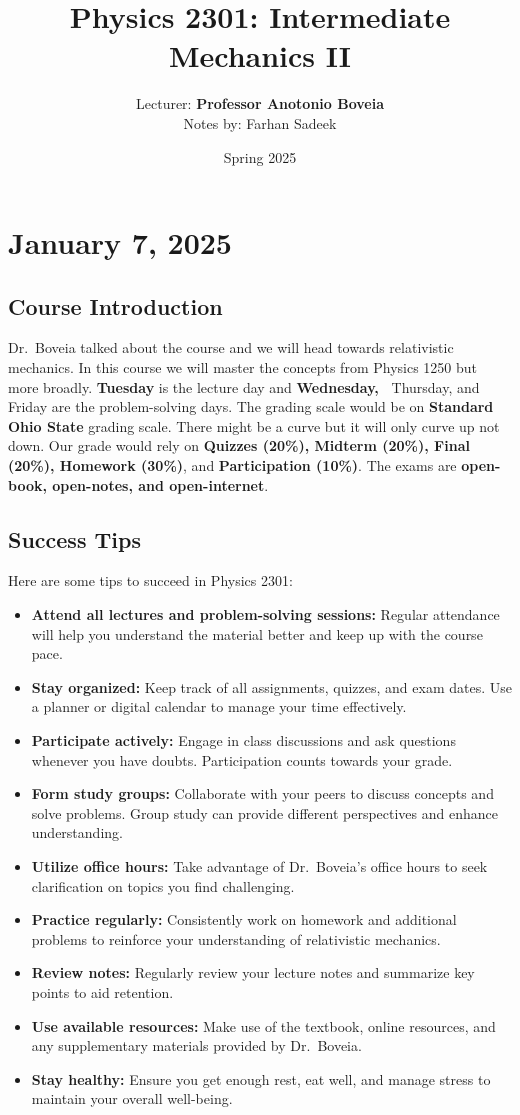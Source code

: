 \documentclass[11pt, draft]{article}
\title{Physics 2301: Intermediate Mechanics II} \author{Lecturer: \textbf{Professor Anotonio Boveia}\\Notes by: Farhan Sadeek} \date{Spring 2025}
\begin{document}
\maketitle
\section{January 7, 2025}
\subsection{Course Introduction}

Dr.\ Boveia talked about the course and we will head towards relativistic
mechanics. In this course we will master the concepts from Physics 1250 but
more broadly. \textbf{Tuesday} is the lecture day and \textbf{Wednesday,\ }
Thursday, and Friday are the problem-solving days. The grading scale would be
on \textbf{Standard Ohio State} grading scale. There might be a curve but it
will only curve up not down. Our grade would rely on \textbf{Quizzes (20\%),
    Midterm (20\%), Final (20\%), Homework (30\%)}, and \textbf{Participation
    (10\%)}. The exams are \textbf{open-book, open-notes, and open-internet}.

\subsection{Success Tips}
Here are some tips to succeed in Physics 2301:
\begin{itemize}
    \item \textbf{Attend all lectures and problem-solving sessions:} Regular attendance will help you understand the material better and keep up with the course pace.
    \item \textbf{Stay organized:} Keep track of all assignments, quizzes, and exam dates. Use a planner or digital calendar to manage your time effectively.
    \item \textbf{Participate actively:} Engage in class discussions and ask questions whenever you have doubts. Participation counts towards your grade.
    \item \textbf{Form study groups:} Collaborate with your peers to discuss concepts and solve problems. Group study can provide different perspectives and enhance understanding.
    \item \textbf{Utilize office hours:} Take advantage of Dr.\ Boveia's office hours to seek clarification on topics you find challenging.
    \item \textbf{Practice regularly:} Consistently work on homework and additional problems to reinforce your understanding of relativistic mechanics.
    \item \textbf{Review notes:} Regularly review your lecture notes and summarize key points to aid retention.
    \item \textbf{Use available resources:} Make use of the textbook, online resources, and any supplementary materials provided by Dr.\ Boveia.
    \item \textbf{Stay healthy:} Ensure you get enough rest, eat well, and manage stress to maintain your overall well-being.
\end{itemize}
\end{document}
